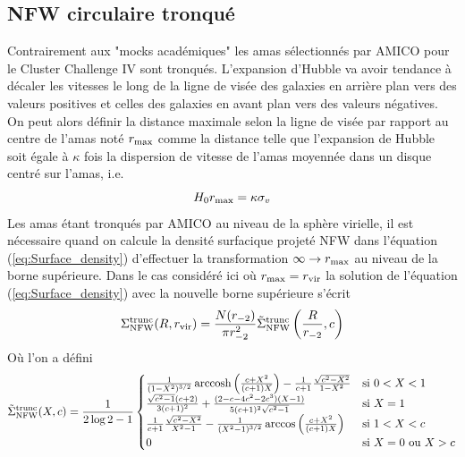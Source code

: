 \documentclass[a4paper,11pt]{article}
\numberwithin{equation}{section}
\DeclareMathOperator{\arccosh}{arccosh}  %
\begin{document}
  \subsection{NFW circulaire tronqué}
    Contrairement aux "mocks académiques" les amas sélectionnés par AMICO pour le Cluster Challenge IV sont tronqués.\newline 
    L'expansion d'Hubble va avoir tendance à décaler les vitesses le long de la ligne de visée des galaxies en arrière plan vers des valeurs positives et celles des galaxies en avant plan vers des valeurs négatives. On peut alors définir la distance maximale selon la ligne de visée par rapport au centre de l'amas noté $r_{\rm{max}}$ comme la distance telle que l'expansion de Hubble soit égale à $\kappa$ fois la dispersion de vitesse de l'amas moyennée dans un disque centré sur l'amas, i.e.
    \begin{equation}
      H_0 r_{\rm{max}} = \kappa \sigma_v
    \end{equation}
    Les amas étant tronqués par AMICO au niveau de la sphère virielle, il est nécessaire quand on calcule la densité surfacique projeté NFW dans l'équation (\ref{eq:Surface_density}) d'effectuer la transformation $\infty \rightarrow r_{\rm{max}}$ au niveau de la borne supérieure.\newline
    Dans le cas considéré ici où $r_{\rm{max}} = r_{\rm{vir}}$ la solution de l'équation (\ref{eq:Surface_density}) avec la nouvelle borne supérieure s'écrit \cite{Mamon2010}
    \begin{equation}
      \Sigma_{\rm{NFW}}^{\rm{trunc}} (R , r_{\rm{vir}}) = \frac{N(r_{-2})}{\pi r_{-2}^2} \tilde{\Sigma}_{\rm{NFW}}^{\rm{trunc}} \left ( \frac{R}{r_{-2}} , c \right )
    \end{equation}
    Où l'on a défini
    \begin{equation}
      \tilde{\Sigma}_{\rm{NFW}}^{\rm{trunc}} ( X, c) = \frac{1}{2 \log 2 - 1}
      \begin{cases}
        \frac{1}{(1-X^2)^{3/2}} \arccosh \left (\frac{c+X^2}{(c+1)X} \right ) - \frac{1}{c+1} \frac{\sqrt{c^2 - X^2}}{1-X^2} & \mbox{si } 0 < X < 1 \\
        \frac{\sqrt{c^2 -1} (c+2)}{3(c+1)^2} + \frac{(2 - c - 4 c^2 - 2 c^3)(X-1)}{5(c+1)^2 \sqrt{c^2 -1}} & \mbox{si } X = 1 \\
        \frac{1}{c+1} \frac{\sqrt{c^2 - X^2}}{X^2-1} - \frac{1}{(X^2-1)^{3/2}} \arccos \left (\frac{c+X^2}{(c+1)X} \right ) & \mbox{si } 1 < X < c \\
        0 & \mbox{si } X = 0 \mbox{ ou } X > c
      \end{cases}
    \end{equation}
\end{document}
